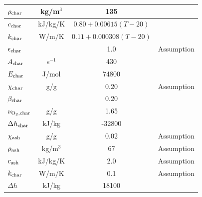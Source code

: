 \begin{table}[p]
\begin{center}
\begin{tabular}{|l|c|c|l|}
$\rho_{\rm char}$       &     kg/m$^3$  & 135                                &                                \\ \hline
$c_{\rm char}$          &    kJ/kg/K    & $0.80+0.00615(T-20)$               &                                \\ \hline
$k_{\rm char}$          &      W/m/K    & $0.11+0.000308(T-20)$              &                                \\ \hline
$\epsilon_{\rm char}$   &               & 1.0                                & Assumption                     \\ \hline
$A_{\rm char}$          & s$^{-1}$      & 430                                & \cite{Porterie:2000PhysFluids} \\ \hline
$E_{\rm char}$          & J/mol         & 74800                              & \cite{Porterie:2000PhysFluids} \\ \hline
$\chi_{\rm char}$       & g/g           & 0.20                               & Assumption                     \\ \hline
$\beta_{\rm char}$      &               & 0.20                               & \cite{Porterie:2006}           \\ \hline
$\nu_{\rm O_2, char}$   & g/g           & 1.65                               & \cite{Porterie:2006}           \\ \hline
$\Delta h_{\rm char}$   & kJ/kg         & -32800                             & \cite{SFPE}                    \\ \hline \hline
$\chi_{\rm ash}$        & g/g           & 0.02                               & Assumption                     \\ \hline
$\rho_{\rm ash}$        &     kg/m$^3$  & 67                                 & Assumption                     \\ \hline
$c_{\rm ash}$           &    kJ/kg/K    & 2.0                                & Assumption                     \\ \hline
$k_{\rm char}$          &      W/m/K    & 0.1                                & Assumption                     \\ \hline \hline
$\Delta h$              &      kJ/kg    & 18100                              & \cite{Hansen:2010}             \\ \hline
\end{tabular}
\end{center}
\label{Pine_Properties}
\end{table}


